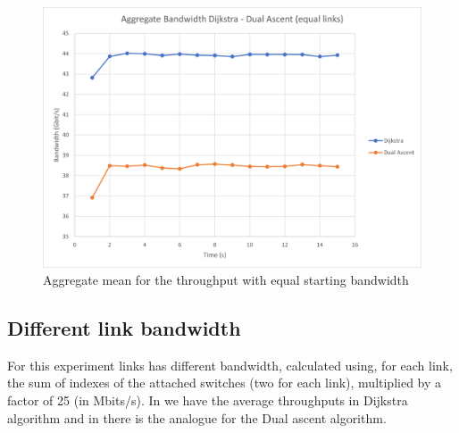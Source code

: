 \begin{figure}[hbt]
	\centering
	\includegraphics[width=\textwidth]{img/aggregate-band-eq.png}
	\caption{Aggregate mean for the throughput with equal starting
	bandwidth}\label{fig:band-aggregate-eq}
\end{figure}

\subsection{Different link bandwidth}

For this experiment links has different bandwidth, calculated using, for each
link, the sum of indexes of the attached switches (two for each link),
multiplied by a factor of 25 (in Mbits/s). In 
we have the average throughputs in Dijkstra algorithm and in
 there is the analogue for the Dual ascent
algorithm.


